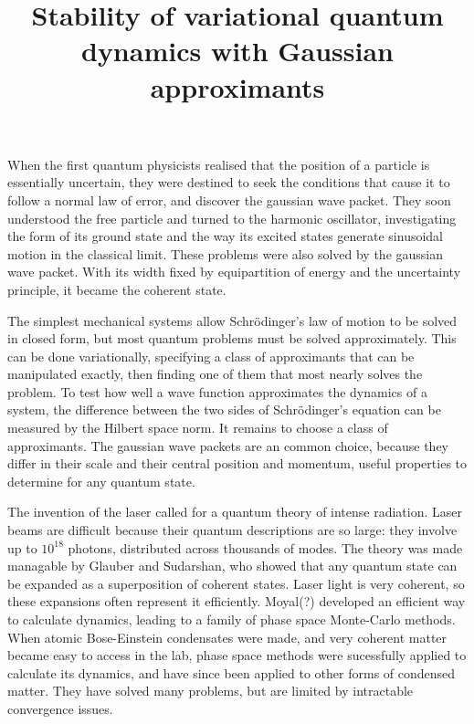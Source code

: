 \nonstopmode




\title{Stability of variational quantum dynamics with Gaussian approximants}


When the first quantum physicists realised that the position of a particle is essentially uncertain, they were destined to seek the conditions that cause it to follow a normal law of error, and discover the gaussian wave packet.  They soon understood the free particle and turned to the harmonic oscillator, investigating the form of its ground state and the way its excited states generate sinusoidal motion in the classical limit.  These problems were also solved by the gaussian wave packet.  With its width fixed by equipartition of energy and the uncertainty principle, it became the coherent state.

The simplest mechanical systems allow Schrödinger's law of motion to be solved in closed form, but most quantum problems must be solved approximately.  This can be done variationally, specifying a class of approximants that can be manipulated exactly, then finding one of them that most nearly solves the problem.  To test how well a wave function approximates the dynamics of a system, the difference between the two sides of Schrödinger's equation can be measured by the Hilbert space norm.  It remains to choose a class of approximants.  The gaussian wave packets are an common choice, because they differ in their scale and their central position and momentum, useful properties to determine for any quantum state.

The invention of the laser called for a quantum theory of intense radiation.  Laser beams are difficult because their quantum descriptions are so large: they involve up to $10^{18}$ photons, distributed across thousands of modes.  The theory was made managable by Glauber and Sudarshan, who showed that any quantum state can be expanded as a superposition of coherent states.  Laser light is very coherent, so these expansions often represent it efficiently.  Moyal(?) developed an efficient way to calculate dynamics, leading to a family of phase space Monte-Carlo methods.  When atomic Bose-Einstein condensates were made, and very coherent matter became easy to access in the lab, phase space methods were sucessfully applied to calculate its dynamics, and have since been applied to other forms of condensed matter.  They have solved many problems, but are limited by intractable convergence issues.

